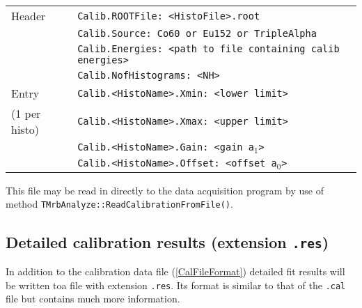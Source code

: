 \documentclass[10pt]{article}
\begin{document}
\begin{center}
\begin{tabular}{|l|l|}
\hline
Header	&	\texttt{Calib.ROOTFile: <HistoFile>.root}		\\
	&	\texttt{Calib.Source: Co60 or Eu152 or TripleAlpha}		\\
	&	\texttt{Calib.Energies: <path to file containing calib energies>}		\\
	&	\texttt{Calib.NofHistograms: <NH>}		\\
\hline
Entry	&	\texttt{Calib.<HistoName>.Xmin:	<lower limit>}	\\
(1 per histo) &	\texttt{Calib.<HistoName>.Xmax:	<upper limit>}	\\
	&	\texttt{Calib.<HistoName>.Gain: <gain a$_1$>}	\\
	&	\texttt{Calib.<HistoName>.Offset: <offset a$_0$>}	\\
\hline
\end{tabular}
\end{center}

This file may be read in directly to the data acquisition program by use of method \texttt{TMrbAnalyze::ReadCalibrationFromFile()}.
\subsection{Detailed calibration results (extension \texttt{.res})}\label{ResFileFormat}
In addition to the calibration data file (\ref{CalFileFormat}) detailed fit results will be written toa file with extension \texttt{.res}.
Its format is similar to that of the \texttt{.cal} file but contains much more information.
\end{document}
